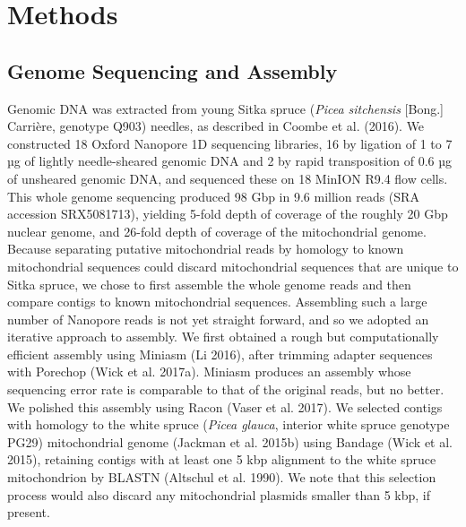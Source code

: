 \documentclass[
  12pt,
  oneside,
  openany]{book}
\begin{document}
\hypertarget{methods-5}{%
\section{Methods}\label{methods-5}}

\hypertarget{genome-sequencing-and-assembly}{%
\subsection{Genome Sequencing and Assembly}\label{genome-sequencing-and-assembly}}

Genomic DNA was extracted from young Sitka spruce (\emph{Picea sitchensis} {[}Bong.{]} Carrière, genotype Q903) needles, as described in Coombe et al. (2016). We constructed 18 Oxford Nanopore 1D sequencing libraries, 16 by ligation of 1 to 7 µg of lightly needle-sheared genomic DNA and 2 by rapid transposition of 0.6 µg of unsheared genomic DNA, and sequenced these on 18 MinION R9.4 flow cells. This whole genome sequencing produced 98 Gbp in 9.6 million reads (SRA accession SRX5081713), yielding 5-fold depth of coverage of the roughly 20 Gbp nuclear genome, and 26-fold depth of coverage of the mitochondrial genome. Because separating putative mitochondrial reads by homology to known mitochondrial sequences could discard mitochondrial sequences that are unique to Sitka spruce, we chose to first assemble the whole genome reads and then compare contigs to known mitochondrial sequences. Assembling such a large number of Nanopore reads is not yet straight forward, and so we adopted an iterative approach to assembly. We first obtained a rough but computationally efficient assembly using Miniasm (Li 2016), after trimming adapter sequences with Porechop (Wick et al. 2017a). Miniasm produces an assembly whose sequencing error rate is comparable to that of the original reads, but no better. We polished this assembly using Racon (Vaser et al. 2017). We selected contigs with homology to the white spruce (\emph{Picea glauca}, interior white spruce genotype PG29) mitochondrial genome (Jackman et al. 2015b) using Bandage (Wick et al. 2015), retaining contigs with at least one 5 kbp alignment to the white spruce mitochondrion by BLASTN (Altschul et al. 1990). We note that this selection process would also discard any mitochondrial plasmids smaller than 5 kbp, if present.
\end{document}
